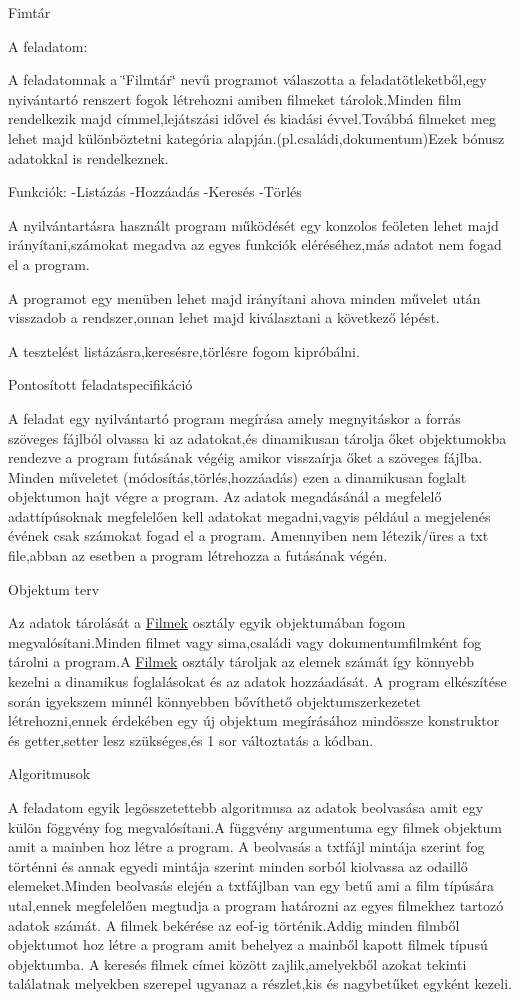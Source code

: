 Fimtár

A feladatom\+:

A feladatomnak a \char`\"{}\+Filmtár\char`\"{} nevű programot válaszotta a feladatötleketből,egy nyivántartó renszert fogok létrehozni amiben filmeket tárolok.\+Minden film rendelkezik majd címmel,lejátszási idővel és kiadási évvel.\+Továbbá filmeket meg lehet majd különböztetni kategória alapján.(pl.\+családi,dokumentum)Ezek bónusz adatokkal is rendelkeznek.

Funkciók\+: -\/Listázás -\/Hozzáadás -\/Keresés -\/Törlés

A nyilvántartásra használt program működését egy konzolos feöleten lehet majd irányítani,számokat megadva az egyes funkciók eléréséhez,más adatot nem fogad el a program.

A programot egy menüben lehet majd irányítani ahova minden művelet után visszadob a rendszer,onnan lehet majd kiválasztani a következő lépést.

A tesztelést listázásra,keresésre,törlésre fogom kipróbálni.

Pontosított feladatspecifikáció

A feladat egy nyilvántartó program megírása amely megnyitáskor a forrás szöveges fájlból olvassa ki az adatokat,és dinamikusan tárolja őket objektumokba rendezve a program futásának végéig amikor visszaírja őket a szöveges fájlba. Minden műveletet (módosítás,törlés,hozzáadás) ezen a dinamikusan foglalt objektumon hajt végre a program. Az adatok megadásánál a megfelelő adattípúsoknak megfelelően kell adatokat megadni,vagyis például a megjelenés évének csak számokat fogad el a program. Amennyiben nem létezik/üres a txt file,abban az esetben a program létrehozza a futásának végén.

Objektum terv

Az adatok tárolását a \mbox{\hyperlink{class_filmek}{Filmek}} osztály egyik objektumában fogom megvalósítani.\+Minden filmet vagy sima,családi vagy dokumentumfilmként fog tárolni a program.\+A \mbox{\hyperlink{class_filmek}{Filmek}} osztály tároljak az elemek számát így könnyebb kezelni a dinamikus foglalásokat és az adatok hozzáadását. A program elkészítése során igyekszem minnél könnyebben bővíthető objektumszerkezetet létrehozni,ennek érdekében egy új objektum megírásához mindössze konstruktor és getter,setter lesz szükséges,és 1 sor változtatás a kódban.

Algoritmusok

A feladatom egyik legösszetettebb algoritmusa az adatok beolvasása amit egy külön föggvény fog megvalósítani.\+A függvény argumentuma egy filmek objektum amit a mainben hoz létre a program. A beolvasás a txtfájl mintája szerint fog történni és annak egyedi mintája szerint minden sorból kiolvassa az odaillő elemeket.\+Minden beolvasás elején a txtfájlban van egy betű ami a film típúsára utal,ennek megfelelően megtudja a program határozni az egyes filmekhez tartozó adatok számát. A filmek bekérése az eof-\/ig történik.\+Addig minden filmből objektumot hoz létre a program amit behelyez a mainből kapott filmek típusú objektumba. A keresés filmek címei között zajlik,amelyekből azokat tekinti találatnak melyekben szerepel ugyanaz a részlet,kis és nagybetűket egyként kezeli.


